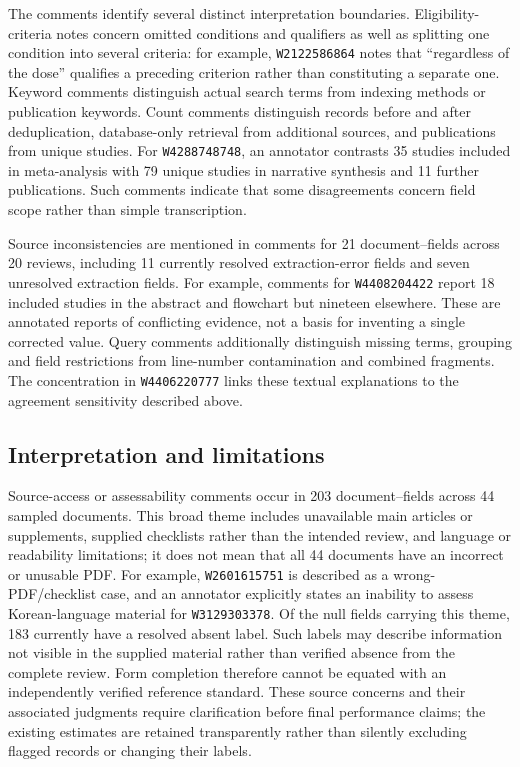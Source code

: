The comments identify several distinct interpretation boundaries. Eligibility-criteria notes concern omitted conditions and qualifiers as well as splitting one condition into several criteria: for example, \texttt{W2122586864} notes that ``regardless of the dose'' qualifies a preceding criterion rather than constituting a separate one. Keyword comments distinguish actual search terms from indexing methods or publication keywords. Count comments distinguish records before and after deduplication, database-only retrieval from additional sources, and publications from unique studies. For \texttt{W4288748748}, an annotator contrasts 35 studies included in meta-analysis with 79 unique studies in narrative synthesis and 11 further publications. Such comments indicate that some disagreements concern field scope rather than simple transcription.

Source inconsistencies are mentioned in comments for 21 document--fields across 20 reviews, including 11 currently resolved extraction-error fields and seven unresolved extraction fields. For example, comments for \texttt{W4408204422} report 18 included studies in the abstract and flowchart but nineteen elsewhere. These are annotated reports of conflicting evidence, not a basis for inventing a single corrected value. Query comments additionally distinguish missing terms, grouping and field restrictions from line-number contamination and combined fragments. The concentration in \texttt{W4406220777} links these textual explanations to the agreement sensitivity described above.



\subsection*{Interpretation and limitations}
Source-access or assessability comments occur in 203 document--fields across 44 sampled documents. This broad theme includes unavailable main articles or supplements, supplied checklists rather than the intended review, and language or readability limitations; it does not mean that all 44 documents have an incorrect or unusable PDF. For example, \texttt{W2601615751} is described as a wrong-PDF/checklist case, and an annotator explicitly states an inability to assess Korean-language material for \texttt{W3129303378}. Of the null fields carrying this theme, 183 currently have a resolved absent label. Such labels may describe information not visible in the supplied material rather than verified absence from the complete review. Form completion therefore cannot be equated with an independently verified reference standard. These source concerns and their associated judgments require clarification before final performance claims; the existing estimates are retained transparently rather than silently excluding flagged records or changing their labels.

